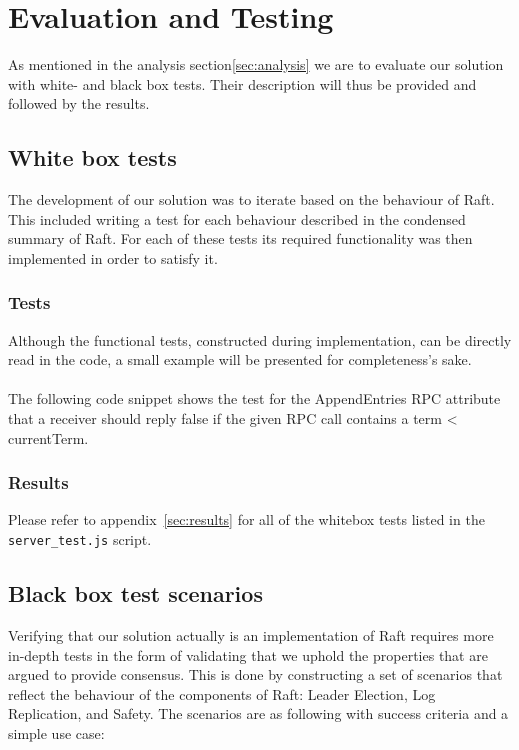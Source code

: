 \section{Evaluation and Testing} %
\label{sec:evaluation_and_testing}
As mentioned in the analysis section\ref{sec:analysis} we are to evaluate our solution with white- and black box tests. Their description will thus be provided and followed by the results.

\subsection{White box tests}
The development of our solution was to iterate based on the behaviour of Raft. This included writing a test for each behaviour described in the condensed summary of Raft\cite{Raft}. For each of these tests its required functionality was then implemented in order to satisfy it.


\subsubsection{Tests}
Although the functional tests, constructed during implementation, can be directly read in the code, a small example will be presented for completeness's sake.\\ \\
The following code snippet shows the test for the AppendEntries RPC attribute that a receiver should reply false if the given RPC call contains a term < currentTerm.


\subsubsection{Results}
Please refer to appendix~\ref{sec:results} for all of the whitebox tests listed in the \texttt{server\_test.js} script.

\subsection{Black box test scenarios}
Verifying that our solution actually is an implementation of Raft requires more in-depth tests in the form of validating that we uphold the properties that are argued to provide consensus. This is done by constructing a set of scenarios that reflect the behaviour of the components of Raft: Leader Election, Log Replication, and Safety. The scenarios are as following with success criteria and a simple use case:

